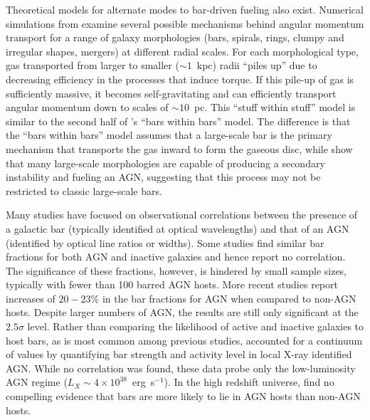 Theoretical models for alternate modes to bar-driven fueling also exist. Numerical simulations from \citet{Hopkins2010} examine several possible mechanisms behind angular momentum transport for a range of galaxy morphologies (bars, spirals, rings, clumpy and irregular shapes, mergers) at different radial scales. For each morphological type, gas transported from larger to smaller ($\sim1$~kpc) radii ``piles up'' due to decreasing efficiency in the processes that induce torque. If this pile-up of gas is sufficiently massive, it becomes self-gravitating and can efficiently transport angular momentum down to scales of $\sim10$~pc. This ``stuff within stuff'' model is similar to the second half of \citet{Shlosman1989}'s ``bars within bars'' model. The difference is that the ``bars within bars'' model assumes that a large-scale bar is the primary mechanism that transports the gas inward to form the gaseous disc, while \citet{Hopkins2010} show that many large-scale morphologies are capable of producing a secondary instability and fueling an AGN, suggesting that this process may not be restricted to classic large-scale bars. 

Many studies have focused on observational correlations between the presence of a galactic bar (typically identified at optical wavelengths) and that of an AGN (identified by optical line ratios or widths). Some studies \citep[eg,][]{Ho1997,Mulchaey1997,Hunt1999} find similar bar fractions for both AGN and inactive galaxies and hence report no correlation. The significance of these fractions, however, is hindered by small sample sizes, typically with fewer than 100 barred AGN hosts. More recent studies \citep{Knapen2000,Laine2002,Laurikainen2004} report increases of $20-23$\% in the bar fractions for AGN when compared to non-AGN hosts. Despite larger numbers of AGN, the results are still only significant at the $2.5\sigma$ level. Rather than comparing the likelihood of active and inactive galaxies to host bars, as is most common among previous studies, \citet{Cisternas2013} accounted for a continuum of values by quantifying bar strength and activity level in local X-ray identified AGN. While no correlation was found, these data probe only the low-luminosity AGN regime ($L_X\sim4\times10^{38}$~erg~s$^{-1}$). In the high redshift universe, \citet{Cheung2015} find no compelling evidence that bars are more likely to lie in AGN hosts than non-AGN hosts. 


